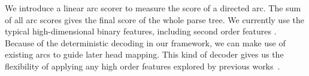 
We introduce a linear arc scorer to measure the score of a directed arc.
The sum of all arc scores gives the final score of the whole parse tree.
We currently use the typical high-dimensional binary features,
including second order features \cite{mcdonald2006online}. 
Because of the deterministic decoding in our framework,
we can make use of existing arcs to guide later head mapping.
This kind of decoder gives us the flexibility of applying any
high order features explored by previous
works~\cite{carreras2007experiments,koo2010efficient,ma2012fourth}.

